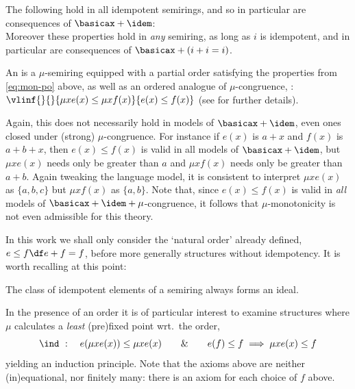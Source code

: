 \documentclass[runningheads]{amsart}
\begin{document}
\begin{corollary}
\label{intro-elim-props-for-+}
    The following hold in all idempotent semirings, and so in particular are consequences of $\basicax + \idem$:
    \begin{equation}
        \label{eq:props-of-nat-ord}
    \end{equation}
    Moreover these properties hold in \emph{any} semiring, as long as $i$ is idempotent, and in particular are consequences of $\basicax + (i+i=i)$.
\end{corollary}


\begin{remark}
    An  is a $\mu$-semiring equipped with a partial order satisfying the properties from \cref{eq:mon-po} above, as well as an ordered analogue of $\mu$-congruence, : $\vlinf{}{}{\mu x e(x) \leq \mu x f(x)}{e(x) \leq f(x)}$ (see \cite{EsikKuich12:mod-aut-theory,EsikLeiss02} for further details).
    
    Again, this does not necessarily hold in models of $\basicax+\idem$, even ones closed under (strong) $\mu$-congruence.
    For instance if $e(x) $ is $a+x$ and $f(x) $ is $a + b + x$, then $e(x)\leq f(x)$ is valid in all models of $\basicax+\idem$, but $\mu x e(x)$ needs only be greater than $a$ and $\mu x f(x) $ needs only be greater than $a+b$.
    Again tweaking the language model, it is consistent to interpret $\mu x e(x) $ as $\{a,b,c\}$ but $\mu x f(x)$ as $\{a,b\}$.
    Note that, since $e(x) \leq f(x) $ is valid in \emph{all} models of $\basicax + \idem + \mu$-congruence, it follows that $\mu$-monotonicity is not even admissible for this theory.
\end{remark}


    
In this work we shall only consider the `natural order' already defined, $e\leq f \df e+f = f$, before more generally structures without idempotency.
It is worth recalling at this point:
\begin{fact}
\label{rem:idempotents-form-ideal}
The class of idempotent elements of a semiring always forms an ideal.
\end{fact}


In the presence of an order it is of particular interest to examine structures where $\mu$ calculates a \emph{least} (pre)fixed point wrt.\ the order,
\[
\ind\ :\quad  
e(\mu x e(x)) \leq \mu x e(x)
\qquad \& \qquad
e(f)\leq f \implies \mu x e(x) \leq f
\]
yielding an induction principle.
Note that the axioms above are neither (in)equational, nor finitely many: there is an axiom for each choice of $f$ above.
\end{document}
